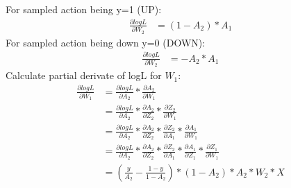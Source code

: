\documentclass{article} %
\begin{document}
    For sampled action being y=1 (UP):
    \begin{align*}
        \frac{\partial logL}{\partial W_{2}} &= (1 - A_{2}) * A_{1}
    \end{align*}
    For sampled action being down y=0 (DOWN):
    \begin{align*}
        \frac{\partial logL}{\partial W_{2}} &= - A_{2} * A_{1}
    \end{align*}
    Calculate partial derivate of logL for $W_{1}$:
    \begin{align*}
        \frac{\partial logL}{\partial W_{1}} &= \frac{\partial logL}{\partial A_{2}} * \frac{\partial A_{2}}{\partial W_{1}} \\
        &= \frac{\partial logL}{\partial A_{2}} * \frac{\partial A_{2}}{\partial Z_{2}}  * \frac{\partial Z_{2}}{\partial W_{1}} \\
        &= \frac{\partial logL}{\partial A_{2}} * \frac{\partial A_{2}}{\partial Z_{2}}  * \frac{\partial Z_{2}}{\partial A_{1}}
        * \frac{\partial A_{1}}{\partial W_{1}} \\
        &= \frac{\partial logL}{\partial A_{2}} * \frac{\partial A_{2}}{\partial Z_{2}}  * \frac{\partial Z_{2}}{\partial A_{1}}
        * \frac{\partial A_{1}}{\partial Z_{1}} * \frac{\partial Z_{1}}{\partial W_{1}} \\
        &= (\frac{y}{A_{2}} - \frac{1 - y}{1 - A_{2}}) * (1 - A_{2}) * A_{2}  * W_{2} * X
    \end{align*}

    
\end{document}

